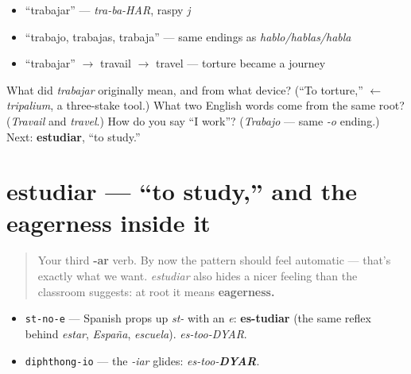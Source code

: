\begin{itemize}
\raggedright
  \item \textquotedblleft{}trabajar\textquotedblright{} — \emph{tra-ba-HAR}, raspy \emph{j}
  \item \textquotedblleft{}trabajo, trabajas, trabaja\textquotedblright{} — same endings as \emph{hablo/hablas/habla}
  \item \textquotedblleft{}trabajar\textquotedblright{} $\to$ travail $\to$ travel — torture became a journey
\end{itemize}

\begin{tcolorbox}[breakable,colback=teal!4,colframe=teal!35!black,title={Before you move on}]
What did \emph{trabajar} originally mean, and from what device? (\textquotedblleft{}To torture,\textquotedblright{} $\leftarrow$ \emph{tripalium}, a three-stake tool.) What two English words come from the same root? (\emph{Travail} and \emph{travel}.) How do you say \textquotedblleft{}I work\textquotedblright{}? (\emph{Trabajo} — same \emph{-o} ending.) Next: \textbf{estudiar}, \textquotedblleft{}to study.\textquotedblright{}
\end{tcolorbox}
\section[estudiar]{estudiar — \textquotedblleft{}to study,\textquotedblright{} and the eagerness inside it}

\label{lesson:ES-C06-estudiar}



\begin{quote}
Your third \textbf{-ar} verb. By now the pattern should feel automatic — that's exactly what we want. \emph{estudiar} also hides a nicer feeling than the classroom suggests: at root it means \textbf{eagerness.}
\end{quote}

\begin{sounds}
\begin{itemize}
\raggedright
  \item \texttt{st-no-e} — Spanish props up \emph{st-} with an \emph{e}: \textbf{es-tudiar} (the same reflex behind \emph{estar}, \emph{España}, \emph{escuela}). \emph{es-too-DYAR}.
  \item \texttt{diphthong-io} — the \emph{-iar} glides: \emph{es-too-\textbf{DYAR}}.
\end{itemize}
\end{sounds}

